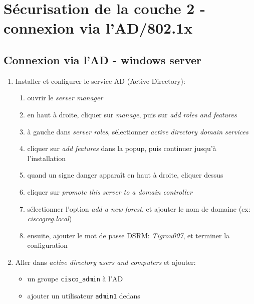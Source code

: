 \documentclass[a4paper]{article}
\begin{document}
\section{Sécurisation de la couche 2 - connexion via l'AD/802.1x}










\subsection{Connexion via l'AD - windows server}





\begin{enumerate}

\item Installer et configurer le service AD (Active Directory):
\begin{enumerate}
    \item ouvrir le \textit{server manager}
    \item en haut à droite, cliquer sur \textit{manage}, puis sur \textit{add roles and features}
    \item à gauche dans \textit{server roles}, sélectionner \textit{active directory domain services}
    \item cliquer sur \textit{add features} dans la popup, puis continuer jusqu'à l'installation
    \item quand un signe danger apparaît en haut à droite, cliquer dessus
    \item cliquer sur \textit{promote this server to a domain controller}
    \item sélectionner l'option \textit{add a new forest}, et ajouter le nom de domaine (ex: \textit{ciscogreg.local})
    \item ensuite, ajouter le mot de passe DSRM: \textit{Tigrou007}, et terminer la configuration
\end{enumerate}

\item Aller dans \textit{active directory users and computers} et ajouter:
\begin{itemize}
    \item un groupe \texttt{cisco\_admin} à l'AD
    \item ajouter un utilisateur \texttt{admin1} dedans
\end{itemize}


\end{enumerate}
\end{document}
